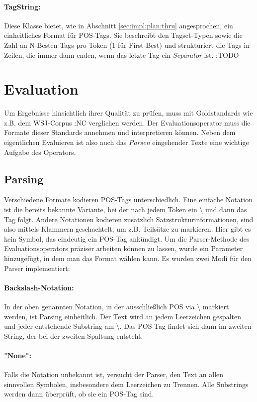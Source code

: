 \paragraph{TagString:} Diese Klasse bietet, wie in Abschnitt \ref{sec:impl:plan:thru} angesprochen, ein einheitliches Format für POS-Tags. Sie beschreibt den Tagset-Typen sowie die Zahl an N-Besten Tags pro Token (1 für First-Best) und strukturiert die Tags in Zeilen, die immer dann enden, wenn das letzte Tag ein \textit{Separator} ist. :TODO



\section{Evaluation}
\label{sec:impl:eval}
Um Ergebnisse hinsichtlich ihrer Qualität zu prüfen, muss mit Goldstandards wie z.B. dem WSJ-Corpus :NC verglichen werden. Der Evaluationsoperator muss die Formate dieser Standards annehmen und interpretieren können. Neben dem eigentlichen Evaluieren ist also auch das \textit{Parsen} eingehender Texte eine wichtige Aufgabe des Operators. 

\subsection{Parsing}
\label{sec:impl:eval:parsing}
Verschiedene Formate kodieren POS-Tags unterschiedlich. Eine einfache Notation ist die bereits bekannte Variante, bei der nach jedem Token ein \glqq \textbackslash \grqq{} und dann das Tag folgt. Andere Notationen kodieren zusätzlich Satzstrukturinformationen, sind also mittels Klammern geschachtelt, um z.B. Teilsätze zu markieren. Hier gibt es kein Symbol, das eindeutig ein POS-Tag ankündigt. Um die Parser-Methode des Evaluationsoperators präziser arbeiten können zu lassen, wurde ein Parameter hinzugefügt, in dem man das Format wählen kann. Es wurden zwei Modi für den Parser implementiert:

\paragraph{Backslash-Notation:} In der oben genannten Notation, in der ausschließlich POS via \glqq \textbackslash \grqq{} markiert werden, ist Parsing einheitlich. Der Text wird an jedem Leerzeichen gespalten und jeder entstehende Substring am \glqq \textbackslash \grqq{}. Das POS-Tag findet sich dann im zweiten String, der bei der zweiten Spaltung entsteht.

\paragraph{"None":} Falls die Notation unbekannt ist, versucht der Parser, den Text an allen sinnvollen Symbolen, insbesondere dem Leerzeichen zu Trennen. Alle Substrings werden dann überprüft, ob sie ein POS-Tag sind. 

